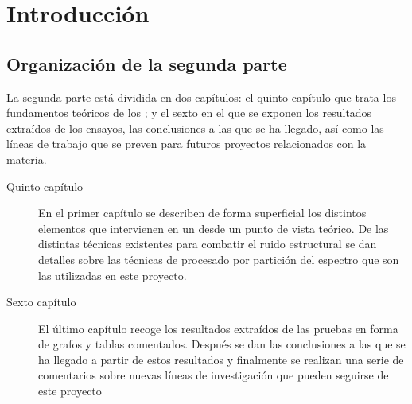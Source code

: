 \chapter*{Introducción}

\section*{Organización de la segunda parte}

La segunda parte está dividida en dos capítulos: el quinto capítulo que
trata los fundamentos teóricos de los ; y el sexto en el que se
exponen los resultados extraídos de los ensayos, las conclusiones a las que
se ha llegado, así como las líneas de trabajo que se preven para futuros
proyectos relacionados con la materia.%


\begin{description}
	\item[Quinto capítulo] En el primer capítulo se describen de forma
		superficial los distintos elementos que intervienen en un
		 desde un punto de vista teórico. De las
		distintas técnicas existentes para combatir el ruido
		estructural se dan detalles sobre las técnicas de procesado
		por partición del espectro que son las utilizadas en este
		proyecto.
	\item[Sexto capítulo] El último capítulo recoge los resultados
		extraídos de las pruebas en forma de grafos y tablas
		comentados. Después se dan las conclusiones a las que se ha
		llegado a partir de estos resultados y finalmente se
		realizan una serie de comentarios sobre nuevas líneas de
		investigación que pueden seguirse de este proyecto
\end{description}
